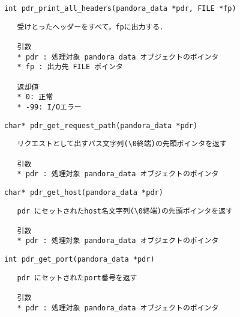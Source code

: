 {\large\verb|int pdr_print_all_headers(pandora_data *pdr, FILE *fp)|}
\begin{verbatim}
   受けとったヘッダーをすべて，fpに出力する．

   引数
   * pdr : 処理対象 pandora_data オブジェクトのポインタ
   * fp : 出力先 FILE ポインタ
   
   返却値
   * 0: 正常
   * -99: I/Oエラー
\end{verbatim}
{\large\verb|char* pdr_get_request_path(pandora_data *pdr)|}
\begin{verbatim}
   リクエストとして出すパス文字列(\0終端)の先頭ポインタを返す

   引数
   * pdr : 処理対象 pandora_data オブジェクトのポインタ
\end{verbatim}
{\large\verb|char* pdr_get_host(pandora_data *pdr)|}
\begin{verbatim}
   pdr にセットされたhost名文字列(\0終端)の先頭ポインタを返す

   引数
   * pdr : 処理対象 pandora_data オブジェクトのポインタ
\end{verbatim}
{\large\verb|int pdr_get_port(pandora_data *pdr)|}
\begin{verbatim}
   pdr にセットされたport番号を返す

   引数
   * pdr : 処理対象 pandora_data オブジェクトのポインタ
\end{verbatim}
